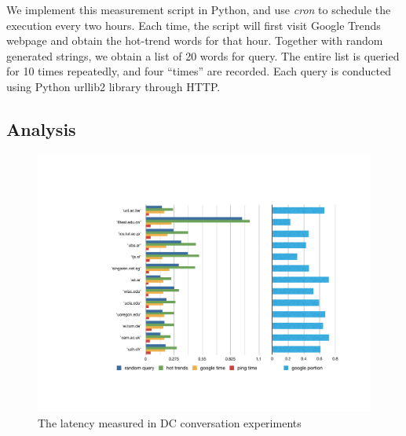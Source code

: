 We implement this measurement script in Python, and use {\it cron} to schedule the execution every two hours. Each time, the script will first visit Google Trends webpage and obtain the hot-trend words for that hour. Together with random generated strings, we obtain a list of 20 words for query. The entire list is queried for 10 times repeatedly, and four ``times'' are recorded. Each query is conducted using Python urllib2 library through HTTP. 


\subsection{Analysis}
\label{sec:analysis}

\begin{figure}
  \centering
  \includegraphics[width=\linewidth]{../figs/data_center.pdf}
  \caption{The latency measured in DC conversation experiments}
  \label{fig:data_center}
\end{figure}


